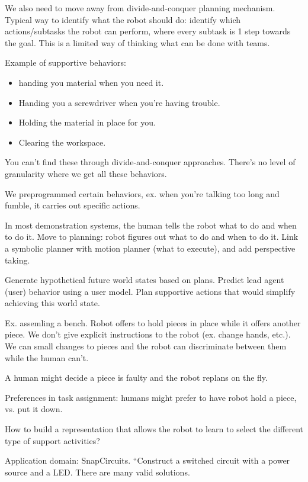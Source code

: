 We also need to move away from divide-and-conquer planning mechanism. Typical way to identify what the robot should do: identify which actions/subtasks the robot can perform, where every subtask is 1 step towards the goal. This is a limited way of thinking what can be done with teams.

Example of supportive behaviors: 
\begin{itemize}
\item
handing you material when you need it. 
\item
Handing you a screwdriver when you're having trouble.
\item
Holding the material in place for you.
\item
Clearing the workspace.
\end{itemize}
You can't find these through divide-and-conquer approaches.
There's no level of granularity where we get all these behaviors.

We preprogrammed certain behaviors, ex. when you're talking too long and fumble, it carries out specific actions.

In most demonstration systems, the human tells the robot what to do and when to do it. Move to planning: robot figures out what to do and when to do it.
Link a symbolic planner %
with motion planner (what to execute), and add perspective taking.

Generate hypothetical future world states based on plans. Predict lead agent (user) behavior using a user model. Plan supportive actions that would simplify achieving this world state.

Ex. assemling a bench. Robot offers to hold pieces in place while it offers another piece. We don't give explicit instructions  to the robot (ex. change hands, etc.). We can small changes to pieces and the robot can discriminate between them while the human can't.

A human might decide a piece is faulty and the robot replans on the fly.

Preferences in task assignment: humans might prefer to have robot hold a piece, vs. put it down.

How to build a representation that allows the robot to learn to select the different type of support activities?

Application domain: SnapCircuits. ``Construct a switched circuit with a power source and a LED. There are many valid solutions.


